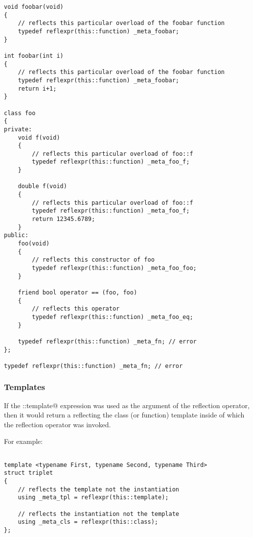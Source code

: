 \begin{verbatim}
void foobar(void)
{
	// reflects this particular overload of the foobar function
	typedef reflexpr(this::function) _meta_foobar;
}

int foobar(int i)
{
	// reflects this particular overload of the foobar function
	typedef reflexpr(this::function) _meta_foobar;
	return i+1;
}

class foo
{
private:
	void f(void)
	{
		// reflects this particular overload of foo::f
		typedef reflexpr(this::function) _meta_foo_f;
	}

	double f(void)
	{
		// reflects this particular overload of foo::f
		typedef reflexpr(this::function) _meta_foo_f;
		return 12345.6789;
	}
public:
	foo(void)
	{
		// reflects this constructor of foo
		typedef reflexpr(this::function) _meta_foo_foo;
	}

	friend bool operator == (foo, foo)
	{
		// reflects this operator
		typedef reflexpr(this::function) _meta_foo_eq;
	}

	typedef reflexpr(this::function) _meta_fn; // error
};

typedef reflexpr(this::function) _meta_fn; // error
\end{verbatim}

\subsubsection{Templates}

If the \verb@this::template@ expression was used as the argument of the reflection
operator, then it would return a  reflecting the class (or function)
template inside of which the reflection operator was invoked.

For example:

\begin{verbatim}

template <typename First, typename Second, typename Third>
struct triplet
{
	// reflects the template not the instantiation
	using _meta_tpl = reflexpr(this::template);

	// reflects the instantiation not the template
	using _meta_cls = reflexpr(this::class);
};
\end{verbatim}
